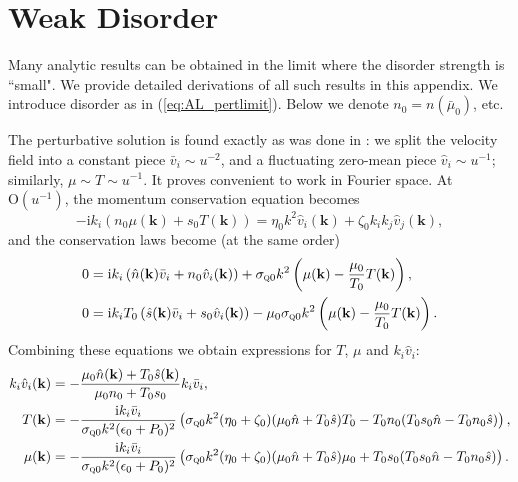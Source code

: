 \section{Weak Disorder}\label{appmom}
Many analytic results can be obtained in the limit where the disorder strength is ``small".   We provide detailed derivations of all such results in this appendix.    We introduce disorder as in (\ref{eq:AL_pertlimit}).    Below we denote $n_0 = n(\bar\mu_0)$, etc.

The perturbative solution is found exactly as was done in \cite{lucas}:   we split the velocity field into a constant piece $\bar v_i \sim u^{-2}$, and a fluctuating zero-mean piece $\hat v_i \sim u^{-1}$;  similarly, $ \mu \sim  T \sim u^{-1}$.   It proves convenient to work in Fourier space.   At $\mathrm{O}(u^{-1})$, the momentum conservation equation becomes \begin{equation}
-\mathrm{i}k_i \left(n_0  \mu(\mathbf{k})+s_0 T(\mathbf{k})\right) = \eta_0 k^2  \hat v_i(\mathbf{k}) + \zeta_0 k_ik_j  \hat v_j(\mathbf{k}),
\end{equation} 
and the conservation laws become (at the same order) \begin{subequations}\begin{align}
0 &= \mathrm{i}k_i \left(\hat n(\mathbf{k})  \bar v_i + n_0  \hat v_i(\mathbf{k})\right)+ \sigma_{\textsc{q}0} k^2 \left( \mu(\mathbf{k}) - \frac{\mu_0}{T_0} T(\mathbf{k})\right), \\
0 &= \mathrm{i}k_i T_0 \left(\hat s(\mathbf{k})  \bar v_i + s_0  \hat v_i(\mathbf{k})\right) -\mu_0\sigma_{\textsc{q}0} k^2 \left( \mu(\mathbf{k}) - \frac{\mu_0}{T_0} T(\mathbf{k})\right).
\end{align}\end{subequations}
Combining these equations we obtain expressions for $ T$, $ \mu$ and $k_i  \hat v_i$: \begin{subequations}\begin{align}
k_i  \hat v_i(\mathbf{k}) &= -\frac{\mu_0 \hat n(\mathbf{k}) + T_0\hat s(\mathbf{k})}{\mu_0 n_0 + T_0s_0} k_i  \bar v_i, \\
 T(\mathbf{k}) &= -\frac{\mathrm{i}k_i  \bar v_i}{\sigma_{\textsc{q}0}k^2(\epsilon_0+P_0)^2}\left(\sigma_{\textsc{q}0}k^2 (\eta_0+\zeta_0)(\mu_0 \hat n + T_0\hat s)T_0 - T_0n_0(T_0s_0\hat n-T_0n_0\hat s)\right), \\
 \mu(\mathbf{k}) &= -\frac{\mathrm{i}k_i  \bar v_i}{\sigma_{\textsc{q}0}k^2(\epsilon_0+P_0)^2}\left(\sigma_{\textsc{q}0}k^2 (\eta_0+\zeta_0)(\mu_0 \hat n + T_0\hat s)\mu_0 + T_0s_0(T_0s_0\hat n-T_0n_0\hat s)\right).
\end{align}\end{subequations}
